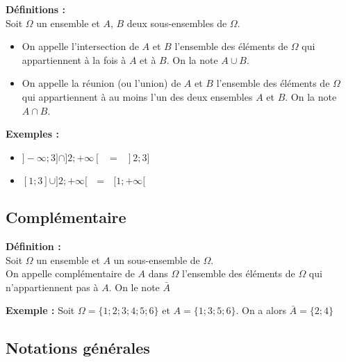 \documentclass{article}
\begin{document}
\begin{mdframed}[style=definitionStyle]
    \textbf{Définitions :} ~\\
    Soit $\Omega$ un ensemble et $A$, $B$ deux sous-ensembles de $\Omega$.
    \begin{itemize}
      \item On appelle l'intersection de $A$ et $B$ l'ensemble des éléments de $\Omega$ qui appartiennent à la fois à
      $A$ et à $B$. On la note $A \cup B$.
      \item On appelle la réunion (ou l'union) de $A$ et $B$ l'ensemble des éléments de $\Omega$ qui appartiennent à au
      moins l'un des deux ensembles $A$ et $B$. On la note $A \cap B$.
    \end{itemize}
\end{mdframed}

\textbf{Exemples :}
\vspace{-4pt}
\begin{itemize}
  \item $ ]-\infty;3]\cap]2;+\infty[ \text{ $=$ } ]2;3]$
  \item $ [1;3] \cup ]2;+\infty[ \text{ $=$ } [1;+\infty[ $
\end{itemize}

\subsection{Complémentaire}

\begin{mdframed}[style=definitionStyle]
    \textbf{Définition :} ~\\
    Soit $\Omega$ un ensemble et $A$ un sous-ensemble de $\Omega$.\\
    On appelle complémentaire de $A$ dans $\Omega$ l'ensemble des éléments de $\Omega$ qui n'appartiennent pas à $A$. On le note $\bar{A}$
\end{mdframed}

\textbf{Exemple :} Soit $\Omega=\{ 1; 2; 3; 4; 5; 6 \}$ et $A=\{1; 3; 5; 6\}$. On a alors $\bar{A}=\{2; 4\}$

\subsection{Notations générales}
\end{document}
